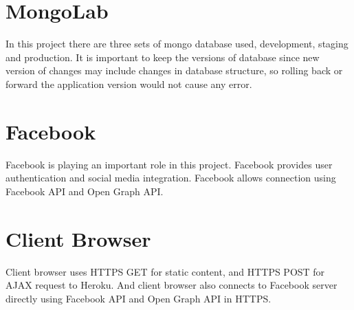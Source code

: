 \section{MongoLab}
In this project there are three sets of mongo database used, development, staging and production. It is important to keep the versions of database since new version of changes may include changes in database structure, so rolling back or forward the application version would not cause any error. 

\section{Facebook}
Facebook is playing an important role in this project. Facebook provides user authentication and social media integration. Facebook allows connection using Facebook API and Open Graph API.

\section{Client Browser}
Client browser uses HTTPS GET for static content, and HTTPS POST for AJAX request to Heroku. And client browser also connects to Facebook server directly using Facebook API and Open Graph API in HTTPS.
 
